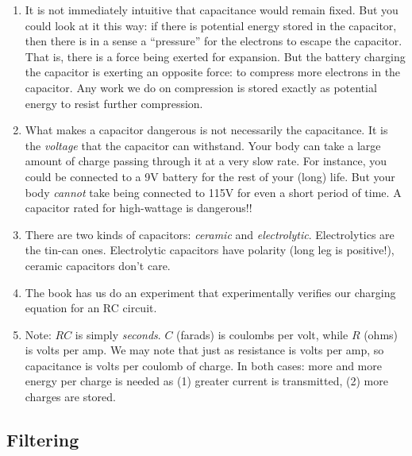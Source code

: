 \documentclass[11pt, oneside]{amsart}
\begin{document}
\begin{enumerate}
  \item It is not immediately intuitive that capacitance would remain
  fixed. But you could look at it this way: if there is potential energy
  stored in the capacitor, then there is in a sense a ``pressure'' for
  the electrons to escape the capacitor. That is, there is a force being
  exerted for expansion. But the battery charging the capacitor is
  exerting an opposite force: to compress more electrons in the
  capacitor. Any work we do on compression is stored exactly as
  potential energy to resist further compression.

  \item What makes a capacitor dangerous is not necessarily the
  capacitance. It is the \emph{voltage} that the capacitor can
  withstand. Your body can take a large amount of charge passing through
  it at a very slow rate. For instance, you could be connected to a 9V
  battery for the rest of your (long) life. But your body \emph{cannot}
  take being connected to 115V for even a short period of time. A
  capacitor rated for high-wattage is dangerous!!

  \item There are two kinds of capacitors: \emph{ceramic} and
  \emph{electrolytic}. Electrolytics are the tin-can ones. Electrolytic
  capacitors have polarity (long leg is positive!), ceramic capacitors
  don't care. 

  \item The book has us do an experiment that experimentally verifies
  our charging equation for an RC circuit.

  \item Note: $RC$ is simply \emph{seconds}. $C$ (farads) is coulombs
  per volt, while $R$ (ohms) is volts per amp. We may note that just as
  resistance is volts per amp, so capacitance is volts per coulomb of
  charge. In both cases: more and more energy per charge is needed as
  (1) greater current is transmitted, (2) more charges are stored.

\end{enumerate}

\subsection{Filtering}
\end{document}
